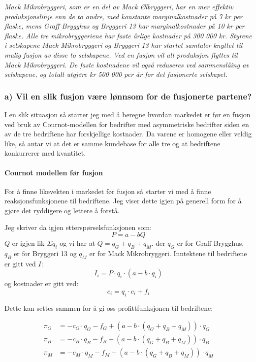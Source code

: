 \documentclass[
  12pt,
  a4paper,
  DIV=11,
  numbers=noendperiod]{scrartcl}
\let\oldparagraph\paragraph
\renewcommand{\paragraph}[1]{\oldparagraph{#1}\mbox{}}
\begin{document}
\textit{Mack Mikrobryggeri, som er en del av Mack Ølbryggeri, har en mer effektiv produksjonslinje enn de to andre, med konstante marginalkostnader på 7 kr per flaske, mens Graff Brygghus og Bryggeri 13 har marginalkostnader på 10 kr per flaske. Alle tre mikrobryggeriene har faste årlige kostnader på 300 000 kr. Styrene i selskapene Mack Mikrobryggeri og Bryggeri 13 har startet samtaler knyttet til mulig fusjon av disse to selskapene. Ved en fusjon vil all produksjon flyttes til Mack Mikrobryggeri. De faste kostnadene vil også reduseres ved sammenslåing av selskapene, og totalt utgjøre kr 500 000 per år for det fusjonerte selskapet.}

\subsubsection{a) Vil en slik fusjon være lønnsom for de fusjonerte
partene?}\label{a-vil-en-slik-fusjon-vuxe6re-luxf8nnsom-for-de-fusjonerte-partene}

I en slik situasjon så starter jeg med å beregne hvordan markedet er før
en fusjon ved bruk av Cournot-modellen for bedrifter med asymmetriske
bedrifter siden en av de tre bedriftene har forskjellige kostnader. Da
varene er homogene eller veldig like, så antar vi at det er samme
kundebase for alle tre og at bedriftene konkurrerer med kvantitet.

\paragraph{Cournot modellen før
fusjon}\label{cournot-modellen-fuxf8r-fusjon}

For å finne likevekten i markedet før fusjon så starter vi med å finne
reaksjonsfunksjonene til bedriftene. Jeg viser dette igjen på generell
form for å gjøre det ryddigere og lettere å forstå.

Jeg skriver da igjen etterspørselsfunksjonen som: \[
P = a - bQ
\] \(Q\) er igjen lik \(\Sigma q_i\) og vi har at
\(Q = q_G + q_B + q_M\). der \(q_G\) er for Graff Brygghus, \(q_B\) er
for Bryggeri 13 og \(q_M\) er for Mack Mikrobryggeri. Inntektene til
bedriftene er gitt ved \(I\): \[
I_i = P \cdot q_i\cdot(a-b\cdot q_i)
\] og kostnader er gitt ved: \[
c_i = q_i \cdot c_i + f_i
\]

Dette kan settes sammen for å gi oss profittfunksjonen til bedriftene:

\begin{align*}
\pi_G &= -c_G\cdot q_G - f_G + (a-b\cdot(q_G+q_B+q_M))\cdot q_G \\
\pi_B &= -c_B\cdot q_B - f_B + (a-b\cdot(q_G+q_B+q_M))\cdot q_B \\
\pi_M &= -c_M\cdot q_M - f_M + (a-b\cdot(q_G+q_B+q_M))\cdot q_M
\end{align*}
\end{document}
